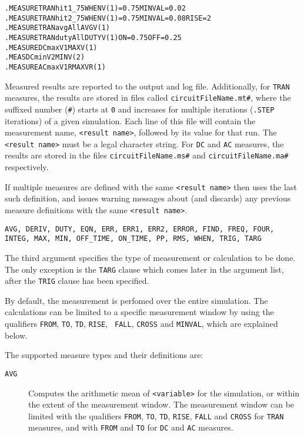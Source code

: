 \begin{Command}
\examples
\begin{alltt}
.MEASURE TRAN hit1_75 WHEN V(1)=0.75 MINVAL=0.02
.MEASURE TRAN hit2_75 WHEN V(1)=0.75 MINVAL=0.08 RISE=2
.MEASURE TRAN avgAll AVG V(1)
.MEASURE TRAN dutyAll DUTY V(1) ON=0.75 OFF=0.25
.MEASURE DC maxV1 MAX V(1)
.MEAS DC minV2 MIN V(2)
.MEASURE AC maxV1R MAX VR(1)
\end{alltt}

\arguments

\begin{Arguments}

Measured results are reported to the output and log file.
Additionally, for \texttt{TRAN} measures, the results are stored in
files called \texttt{circuitFileName.mt\#}, where the suffixed number
(\texttt{\#}) starts at \texttt{0} and increases for multiple
iterations (\texttt{.STEP} iterations) of a given simulation. Each
line of this file will contain the measurement name, \texttt{<result
name>}, followed by its value for that run.  The \texttt{<result
name>} must be a legal \Xyce{} character string.  For
\texttt{DC} and \texttt{AC} measures, the results are stored in the files 
\texttt{circuitFileName.ms\#} and \texttt{circuitFileName.ma\#} respectively.

If multiple measures are defined with the same \texttt{<result name>} then
\Xyce{} uses the last such definition, and issues warning messages about
(and discards) any previous measure definitions with the same
\texttt{<result name>}.


\texttt{AVG, DERIV, DUTY, EQN, ERR, ERR1, ERR2, ERROR, FIND, FREQ, FOUR, INTEG, MAX, MIN, OFF\_TIME, ON\_TIME, PP, RMS, WHEN, TRIG, TARG}

The third argument specifies the type of measurement or calculation to
be done. The only exception is the {\tt TARG} clause which comes later
in the argument list, after the {\tt TRIG} clause has been specified.

By default, the measurement is perfomed over the entire simulation.
The calculations can be limited to a specific measurement window by
using the qualifiers {\tt FROM}, {\tt TO}, {\tt TD}, {\tt RISE}, {\tt
FALL}, {\tt CROSS} and {\tt MINVAL}, which are explained below.

The supported measure types and their definitions are:

\begin{description}
  \item[\tt AVG] Computes the arithmetic mean of {\tt <variable>} for
    the simulation, or within the extent of the measurement window.
    The measurement window can be limited with the qualifiers {\tt FROM},
    {\tt TO}, {\tt TD}, {\tt RISE}, {\tt FALL} and {\tt CROSS} for {\tt TRAN}
    measures, and with {\tt FROM} and {\tt TO} for {\tt DC} and {\tt AC}
    measures.


\end{description}
\end{Arguments}
\end{Command}
